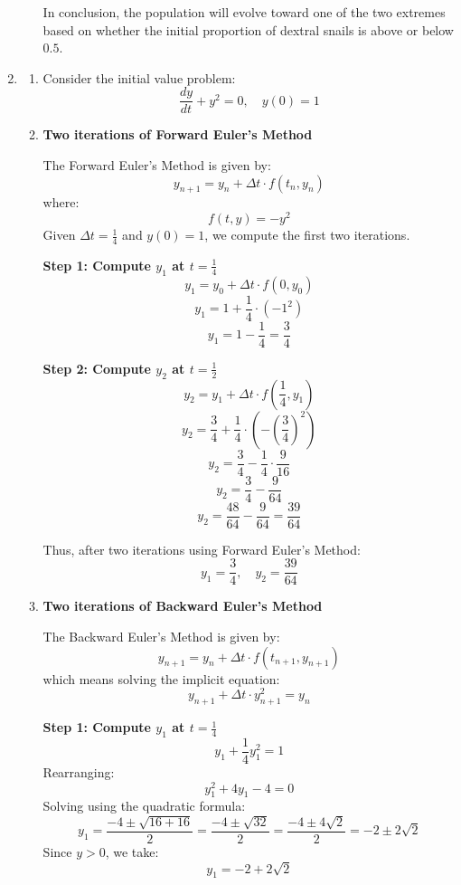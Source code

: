 \documentclass[12pt]{article}
\begin{document}
\begin{enumerate}
\begin{enumerate}
    In conclusion, the population will evolve toward one of the two extremes based on whether the initial proportion of dextral snails is above or below \( 0.5 \).
\end{enumerate}

\item 
\begin{enumerate}

    \item Consider the initial value problem:
    \[
    \frac{dy}{dt} + y^2 = 0, \quad y(0) = 1
    \]

    \item \textbf{Two iterations of Forward Euler’s Method}

    The Forward Euler's Method is given by:
    \[
    y_{n+1} = y_n + \Delta t \cdot f(t_n, y_n)
    \]
    where:
    \[
    f(t, y) = -y^2
    \]
    Given \( \Delta t = \frac{1}{4} \) and \( y(0) = 1 \), we compute the first two iterations.

    \textbf{Step 1: Compute \( y_1 \) at \( t = \frac{1}{4} \)}
    \[
    y_1 = y_0 + \Delta t \cdot f(0, y_0)
    \]
    \[
    y_1 = 1 + \frac{1}{4} \cdot (-1^2)
    \]
    \[
    y_1 = 1 - \frac{1}{4} = \frac{3}{4}
    \]

    \textbf{Step 2: Compute \( y_2 \) at \( t = \frac{1}{2} \)}
    \[
    y_2 = y_1 + \Delta t \cdot f\left(\frac{1}{4}, y_1\right)
    \]
    \[
    y_2 = \frac{3}{4} + \frac{1}{4} \cdot \left(-\left(\frac{3}{4}\right)^2\right)
    \]
    \[
    y_2 = \frac{3}{4} - \frac{1}{4} \cdot \frac{9}{16}
    \]
    \[
    y_2 = \frac{3}{4} - \frac{9}{64}
    \]
    \[
    y_2 = \frac{48}{64} - \frac{9}{64} = \frac{39}{64}
    \]

    Thus, after two iterations using Forward Euler’s Method:
    \[
    y_1 = \frac{3}{4}, \quad y_2 = \frac{39}{64}
    \]

    \item \textbf{Two iterations of Backward Euler’s Method}

    The Backward Euler's Method is given by:
    \[
    y_{n+1} = y_n + \Delta t \cdot f(t_{n+1}, y_{n+1})
    \]
    which means solving the implicit equation:
    \[
    y_{n+1} + \Delta t \cdot y_{n+1}^2 = y_n
    \]

    \textbf{Step 1: Compute \( y_1 \) at \( t = \frac{1}{4} \)}
    \[
    y_1 + \frac{1}{4} y_1^2 = 1
    \]
    Rearranging:
    \[
    y_1^2 + 4 y_1 - 4 = 0
    \]
    Solving using the quadratic formula:
    \[
    y_1 = \frac{-4 \pm \sqrt{16 + 16}}{2} = \frac{-4 \pm \sqrt{32}}{2} = \frac{-4 \pm 4\sqrt{2}}{2} = -2 \pm 2\sqrt{2}
    \]
    Since \( y > 0 \), we take:
    \[
    y_1 = -2 + 2\sqrt{2}
    \]


\end{enumerate}
\end{enumerate}
\end{document}
